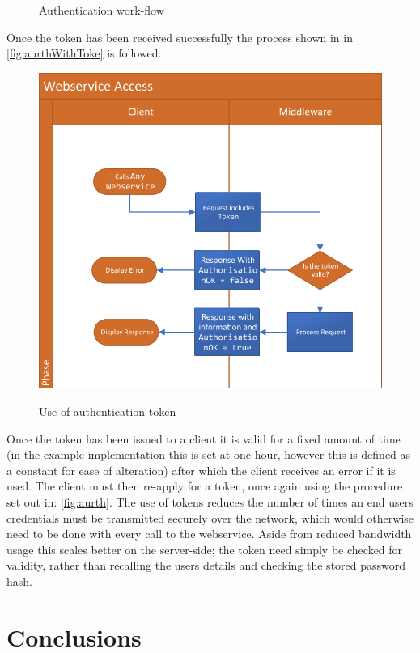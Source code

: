 \begin{figure}[!htbp]
\caption{Authentication work-flow}
\label{fig:aurth}
\end{figure}

Once the token has been received successfully the process shown in in \autoref{fig:aurthWithToke} is followed.

 \begin{figure}[!htbp]
\myfloatalign
{\includegraphics[width=\linewidth]{gfx/MiddlewareAurthenticationWithToken}} 
\caption{Use of authentication token}
\label{fig:aurthWithToke}
\end{figure}

Once the token has been issued to a client it is valid for a fixed amount of time (in the example implementation this is set at one hour, however this is defined as a constant for ease of alteration) after which the client receives an error if it is used. The client must then re-apply for a token, once again using the procedure set out in: \autoref{fig:aurth}. The use of tokens reduces the number of times an end users credentials must be transmitted securely over the network, which would otherwise need to be done with every call to the webservice. Aside from reduced bandwidth usage this scales better on the server-side; the token need simply be checked for validity, rather than recalling the users details and checking the stored password hash.

\section{Conclusions}

